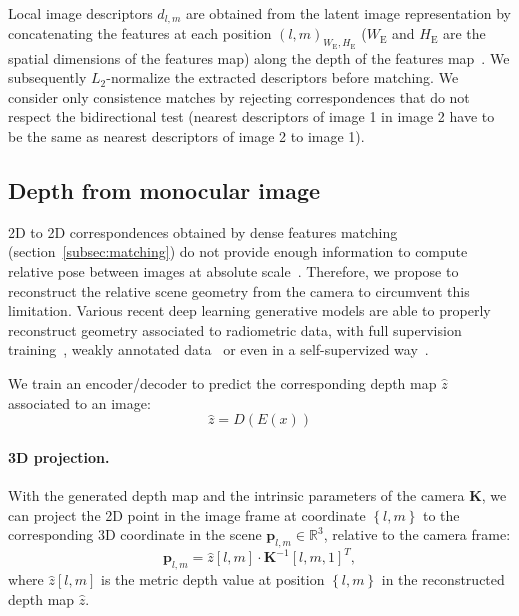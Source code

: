 Local image descriptors $d_{l,m}$ are obtained from the latent image representation by concatenating the features at each position $\left( l, m \right)_{W_\mathrm{E},H_\mathrm{E}}$ ($W_\mathrm{E}$ and $H_\mathrm{E}$ are the spatial dimensions of the features map) along the depth of the features map~\citep{Taira2018, Widya2018}. We subsequently $L_2$-normalize the extracted descriptors before matching. We consider only consistence matches by rejecting correspondences that do not respect the bidirectional test (nearest descriptors of image 1 in image 2 have to be the same as nearest descriptors of image 2 to image 1).

\subsection{Depth from monocular image}
\label{subsec:depth_map}
2D to 2D correspondences obtained by dense features matching (section~\ref{subsec:matching}) do not provide enough information to compute relative pose between images at absolute scale~\cite{Hartley2003}. Therefore, we propose to reconstruct the relative scene geometry from the camera to circumvent this limitation. Various recent deep learning generative models are able to properly reconstruct geometry associated to radiometric data, with full supervision training~\cite{Eigen2014}, weakly annotated data~\cite{Godard2017} or even in a self-supervized way~\cite{Mahjourian2018}. 

We train an encoder/decoder to predict the corresponding depth map $\hat{z}$ associated to an image:
\begin{equation}
\hat{z} = D(E(x))
\end{equation}

\paragraph{3D projection.} With the generated depth map and the intrinsic parameters of the camera $\mathbf{K}$, we can project the 2D point in the image frame at coordinate $\left\{ l,m \right\}$ to the corresponding 3D coordinate in the scene $\mathbf{p}_{l, m}\in\mathbb{R}^3$, relative to the camera frame:
\begin{equation}
	\label{eq:3d_proj}
	\mathbf{p}_{l, m}= \hat{z}\left[ l, m \right] \cdot \mathbf{K}^{-1}[l, m, 1]^T,
\end{equation}
where $\hat{z}\left[ l, m \right]$ is the metric depth value at position $\left\{ l,m \right\}$ in the reconstructed depth map $\hat{z}$.